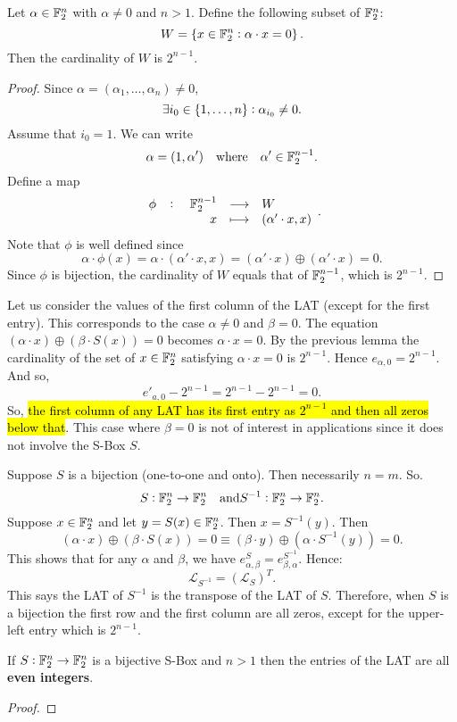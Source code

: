 \begin{tcolorbox}[colback=white,colframe=lemcolor,arc=5pt,title={\color{white}\bf }]
\begin{lemma}
Let $\alpha\in\mathbb{F}_2^n$ with $\alpha\neq 0$ and $n>1$. Define the following subset of $\mathbb{F}_2^n$: \[
W=\set{x\in\mathbb{F}_2^n:\alpha\cdot x=0}.
\] Then the cardinality of $W$ is $2^{n-1}$.
\end{lemma}
\end{tcolorbox}
\begin{proof}
Since $\alpha=(\alpha_1,\dots,\alpha_n)\neq 0$, \[
\exists i_0\in\set{1,\dots,n}:\alpha_{i_0}\neq 0.
\] Assume that $i_0=1$. We can write \[
\alpha=(1,\alpha')\quad\text{where}\quad\alpha'\in\mathbb{F}_2^{n-1}.
\] Define a map \[
\fullfunction{\phi}{\F_2^{n-1}}{W}{x}{(\alpha'\cdot x,x)}.
\] Note that $\phi$ is well defined since \[
\alpha\cdot\phi(x)=\alpha\cdot(\alpha'\cdot x, x)=(\alpha'\cdot x)\oplus(\alpha'\cdot x)=0.
\] Since $\phi$ is bijection,  the cardinality of $W$ equals that of $\mathbb{F}_2^{n-1}$, which is $2^{n-1}$.
\end{proof}

Let us consider the values of the first column of the LAT (except for the first entry). This corresponds to the case $\alpha\neq 0$ and $\beta=0$. The equation $(\alpha\cdot x)\oplus(\beta\cdot S(x))=0$ becomes $\alpha\cdot x=0$. By the previous lemma the cardinality of the set of $x\in\mathbb{F}_2^n$ satisfying $\alpha\cdot x=0$ is $2^{n-1}$. Hence $e_{\alpha,0}=2^{n-1}$. And so, $$
e'_{a,0}-2^{n-1}=2^{n-1}-2^{n-1}=0.
$$ So, \hl{the first column of any LAT has its first entry as $2^{n-1}$ and then all zeros below that}. This case where $\beta=0$ is not of interest in applications since it does not involve the S-Box $S$.

Suppose $S$ is a bijection (one-to-one and onto). Then necessarily $n=m$. So. \[
S:\mathbb{F}_2^n\to\mathbb{F}_2^n\quad\text{and}S^{-1}:\mathbb{F}_2^n\to\mathbb{F}_2^n.
\] Suppose $x\in\mathbb{F}_2^n$ and let $y=S(x)\in\mathbb{F}_2^n$. Then $x=S^{-1}(y)$. Then \[
(\alpha\cdot x)\oplus(\beta\cdot S(x))=0\equiv(\beta\cdot y)\oplus(\alpha\cdot S^{-1}(y))=0.
\] This shows that for any $\alpha$ and $\beta$, we have $e_{\alpha,\beta}^S=e_{\beta,\alpha}^{S^{-1}}$. Hence: \[
\mathcal{L}_{S^{-1}}=(\mathcal{L}_S)^T.
\] This says the LAT of $S^{-1}$ is the transpose of the LAT of $S$. Therefore, when $S$ is a bijection the first row and the first column are all zeros, except for the upper-left entry which is $2^{n-1}$.

\newpage
\begin{tcolorbox}[colback=white,colframe=lemcolor,arc=5pt,title={\color{white}\bf }]
\begin{proposition}
If $S:\mathbb{F}_2^n\to\mathbb{F}_2^n$ is a bijective S-Box and $n>1$ then the entries of the LAT are all \textbf{even integers}.
\end{proposition}
\end{tcolorbox}
\begin{proof}
	
\end{proof}
\newpage
